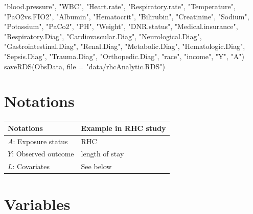 \documentclass[
]{book}
\newenvironment{Shaded}{\begin{snugshade}}{\end{snugshade}}
\newcommand{\AttributeTok}[1]{\textcolor[rgb]{0.77,0.63,0.00}{#1}}
\newcommand{\FunctionTok}[1]{\textcolor[rgb]{0.00,0.00,0.00}{#1}}
\newcommand{\NormalTok}[1]{#1}
\newcommand{\StringTok}[1]{\textcolor[rgb]{0.31,0.60,0.02}{#1}}
\begin{document}
\begin{Shaded}
\begin{Highlighting}[]
                    \StringTok{"blood.pressure"}\NormalTok{, }\StringTok{"WBC"}\NormalTok{, }\StringTok{"Heart.rate"}\NormalTok{, }\StringTok{"Respiratory.rate"}\NormalTok{, }
                    \StringTok{"Temperature"}\NormalTok{, }\StringTok{"PaO2vs.FIO2"}\NormalTok{, }\StringTok{"Albumin"}\NormalTok{, }\StringTok{"Hematocrit"}\NormalTok{, }
                    \StringTok{"Bilirubin"}\NormalTok{, }\StringTok{"Creatinine"}\NormalTok{, }\StringTok{"Sodium"}\NormalTok{, }\StringTok{"Potassium"}\NormalTok{, }\StringTok{"PaCo2"}\NormalTok{, }
                    \StringTok{"PH"}\NormalTok{, }\StringTok{"Weight"}\NormalTok{, }\StringTok{"DNR.status"}\NormalTok{, }\StringTok{"Medical.insurance"}\NormalTok{, }
                    \StringTok{"Respiratory.Diag"}\NormalTok{, }\StringTok{"Cardiovascular.Diag"}\NormalTok{, }
                    \StringTok{"Neurological.Diag"}\NormalTok{, }\StringTok{"Gastrointestinal.Diag"}\NormalTok{, }\StringTok{"Renal.Diag"}\NormalTok{,}
                    \StringTok{"Metabolic.Diag"}\NormalTok{, }\StringTok{"Hematologic.Diag"}\NormalTok{, }\StringTok{"Sepsis.Diag"}\NormalTok{, }
                    \StringTok{"Trauma.Diag"}\NormalTok{, }\StringTok{"Orthopedic.Diag"}\NormalTok{, }\StringTok{"race"}\NormalTok{, }\StringTok{"income"}\NormalTok{, }
                    \StringTok{"Y"}\NormalTok{, }\StringTok{"A"}\NormalTok{)}
\FunctionTok{saveRDS}\NormalTok{(ObsData, }\AttributeTok{file =} \StringTok{"data/rhcAnalytic.RDS"}\NormalTok{)}
\end{Highlighting}
\end{Shaded}

\hypertarget{notations}{%
\section{Notations}\label{notations}}

\begin{longtable}[]{@{}ll@{}}
\toprule
Notations & Example in RHC study \\
\midrule
\endhead
\(A\): Exposure status & RHC \\
\(Y\): Observed outcome & length of stay \\
\(L\): Covariates & See below \\
\bottomrule
\end{longtable}

\hypertarget{variables}{%
\section{Variables}\label{variables}}
\end{document}
